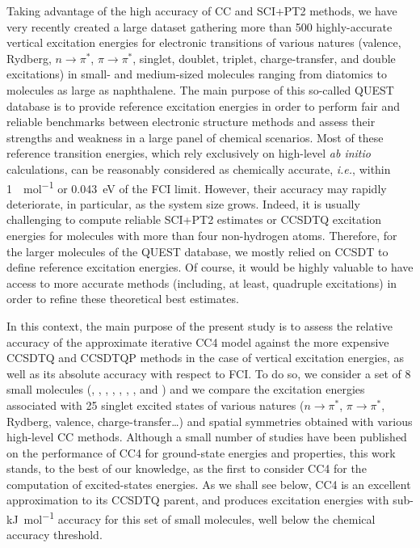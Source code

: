 \documentclass[aip,jcp,reprint,noshowkeys,superscriptaddress]{revtex4-1}
\newcommand{\ie}{\textit{i.e.}}
\newcommand{\npis}{n \to \pi^*}
\newcommand{\pipis}{\pi \to \pi^*}
\begin{document}
Taking advantage of the high accuracy of CC and SCI+PT2 methods, we have very recently created a large dataset gathering more than 500 highly-accurate vertical excitation energies for electronic transitions of various natures (valence, Rydberg, $\npis$, $\pipis$, singlet, doublet, triplet, charge-transfer, and double excitations) in small- and medium-sized molecules ranging from diatomics to molecules as large as naphthalene. \cite{Loos_2018a,Loos_2019,Loos_2020a,Loos_2020b,Loos_2020c,Veril_2021}
The main purpose of this so-called QUEST database is to provide reference excitation energies in order to perform fair and reliable benchmarks between electronic structure methods and assess their strengths and weakness in a large panel of chemical scenarios.
Most of these reference transition energies, which rely exclusively on high-level \textit{ab initio} calculations, can be reasonably considered as chemically accurate, \ie, within \SI{1}{\kcal\per\mol} or \SI{0.043}{\eV} of the FCI limit.
However, their accuracy may rapidly deteriorate, in particular, as the system size grows.
Indeed, it is usually challenging to compute reliable SCI+PT2 estimates or CCSDTQ excitation energies for molecules with more than four non-hydrogen atoms.
Therefore, for the larger molecules of the QUEST database, we mostly relied on CCSDT to define reference excitation energies.
Of course, it would be highly valuable to have access to more accurate methods (including, at least, quadruple excitations) in order to refine these theoretical best estimates.

In this context, the main purpose of the present study is to assess the relative accuracy of the approximate iterative CC4 model against the more expensive CCSDTQ and CCSDTQP methods in the case of vertical excitation energies, as well as its absolute accuracy with respect to FCI.
To do so, we consider a set of 8 small molecules (, , , , , , , and ) and we compare the excitation energies associated with 25 singlet excited states of various natures ($\npis$, $\pipis$, Rydberg, valence, charge-transfer\ldots) and spatial symmetries obtained with various high-level CC methods.
Although a small number of studies have been published on the performance of CC4 for ground-state energies and properties, \cite{Kallay_2005,Matthews_2015a,Matthews_2021} this work stands, to the best of our knowledge, as the first to consider CC4 for the computation of excited-states energies.
As we shall see below, CC4 is an excellent approximation to its CCSDTQ parent, and produces excitation energies with sub-\si{\kJ\per\mol} accuracy for this set of small molecules, well below the chemical accuracy threshold.
\end{document}
